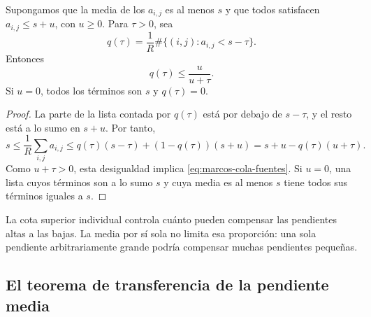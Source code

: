 \begin{lema}
Supongamos que la media de los $a_{i,j}$ es al menos $s$ y que
todos satisfacen $a_{i,j}\le s+u$, con $u\ge0$. Para $\tau>0$, sea
\[
 q(\tau)=\frac1R\#\{(i,j):a_{i,j}<s-\tau\}.
\]
Entonces
\begin{equation}
 q(\tau)\le\frac{u}{u+\tau}.
 \label{eq:marcos-cola-fuentes}
\end{equation}
Si $u=0$, todos los términos son $s$ y $q(\tau)=0$.
\label{lem:marcos-cola}
\end{lema}

\begin{proof}
La parte de la lista contada por $q(\tau)$ está por debajo de
$s-\tau$, y el resto está a lo sumo en $s+u$. Por tanto,
\[
 s\le\frac1R\sum_{i,j}a_{i,j}
 \le q(\tau)(s-\tau)+(1-q(\tau))(s+u)
 =s+u-q(\tau)(u+\tau).
\]
Como $u+\tau>0$, esta desigualdad implica
\eqref{eq:marcos-cola-fuentes}. Si $u=0$, una lista cuyos términos
son a lo sumo $s$ y cuya media es al menos $s$ tiene todos sus
términos iguales a $s$.
\end{proof}

La cota superior individual controla cuánto pueden compensar las
pendientes altas a las bajas. La media por sí sola no limita esa
proporción: una sola pendiente arbitrariamente grande podría compensar
muchas pendientes pequeñas.

\subsection{El teorema de transferencia de la pendiente media}

